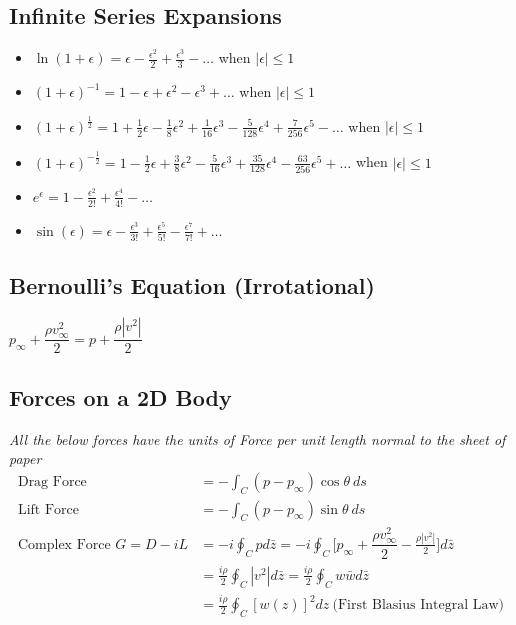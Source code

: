 \documentclass[11pt, letterpaper, notitlepage]{article}
\begin{document}
\subsection{Infinite Series Expansions}
\begin{itemize}
  \item $\ln(1+\epsilon) = \epsilon - \frac{\epsilon^2}{2} + \frac{\epsilon^3}{3} - \dots$ when $|\epsilon| \le 1$
  \item $(1+\epsilon)^{-1} = 1 - \epsilon + \epsilon^2 - \epsilon^3 + \dots$ when $|\epsilon| \le 1$
  \item $(1+\epsilon)^{\frac{1}{2}} = 1 + \frac{1}{2} \epsilon - \frac{1}{8} \epsilon^2 + \frac{1}{16} \epsilon^3 - \frac{5}{128} \epsilon^4 + \frac{7}{256} \epsilon^5 - \dots$ when $|\epsilon| \le 1$
  \item $(1+\epsilon)^{-\frac{1}{2}} = 1 - \frac{1}{2} \epsilon + \frac{3}{8} \epsilon^2 - \frac{5}{16} \epsilon^3 + \frac{35}{128} \epsilon^4 - \frac{63}{256} \epsilon^5 + \dots$ when $|\epsilon| \le 1$
  \item $e^{\epsilon} = 1 - \frac{\epsilon^2}{2!} + \frac{\epsilon^4}{4!} - \dots$
  \item $\sin(\epsilon) = \epsilon - \frac{\epsilon^3}{3!} + \frac{\epsilon^5}{5!} - \frac{\epsilon^7}{7!} + \dots$ 
\end{itemize}

\subsection{Bernoulli's Equation (Irrotational)}
$p_{\infty} + \dfrac{\rho v^2_{\infty}}{2} = p + \dfrac{\rho |v^2|}{2} $

\subsection{Forces on a 2D Body}
\textit{All the below forces have the units of Force per unit length normal to the sheet of paper}
\begin{align*}
\text{Drag Force} &= -\int_{C}^{} (p-p_{\infty}) \cos{\theta}\ ds \\
\text{Lift Force} &= -\int_{C}^{} (p-p_{\infty}) \sin{\theta}\ ds \\
\text{Complex Force } G = D - i L &= -i \oint_{C}^{} p d\bar{z} = -i \oint_{C}^{} \Biggl[ p_{\infty} + \dfrac{\rho v^2_{\infty}}{2} -  \frac{\rho |v^2|}{2} \Biggr] d\bar{z} \\
&= \frac{i \rho}{2} \oint_{C}^{} |v^2| d\bar{z} = \frac{i \rho}{2} \oint_{C}^{} w \bar{w} d\bar{z} \\
&= \frac{i \rho}{2} \oint_{C}^{} [w(z)]^2 dz \ \bigl(\text{First Blasius Integral Law}\bigr) \\
\end{align*}
\end{document}
